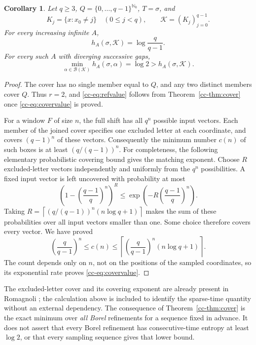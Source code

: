 \documentclass[11pt,reqno]{amsart}
\numberwithin{equation}{section}
\newtheorem{corollary}[theorem]{Corollary}
\theoremstyle{definition}
\theoremstyle{definition}
\newcommand{\Nzero}{\mathbb N_0}
\newcommand{\K}{\mathcal K}
\begin{document}
\begin{corollary}\label{cc-cor:covergap}
Let $q\ge3$, $Q=\{0,\ldots,q-1\}^{\Nzero}$, $T=\sigma$, and
\[
 K_j=\{x:x_0\ne j\}\quad(0\le j<q),\qquad \K=(K_j)_{j=0}^{q-1}.
\]
For every increasing infinite $A$,
\begin{equation}\label{cc-eq:covervalue}
 h_A(\sigma,\K)=\log\frac q{q-1}.
\end{equation}
For every such $A$ with diverging successive gaps,
\begin{equation}\label{cc-eq:refvalue}
 \min_{\alpha\in\mathcal B(\K)}h_A(\sigma,\alpha)=\log2
 >h_A(\sigma,\K).
\end{equation}
\end{corollary}
\begin{proof}
The cover has no single member equal to $Q$, and any two distinct
members cover $Q$. Thus $r=2$, and \eqref{cc-eq:refvalue} follows from
Theorem~\ref{cc-thm:cover} once \eqref{cc-eq:covervalue} is proved.

For a window $F$ of size $n$, the full shift has all $q^n$ possible
input vectors. Each member of the joined cover specifies one excluded
letter at each coordinate, and covers $(q-1)^n$ of these vectors.
Consequently the minimum number $c(n)$ of such boxes is at least
$(q/(q-1))^n$. For completeness, the following elementary probabilistic
covering bound gives the matching exponent. Choose $R$ excluded-letter
vectors independently and uniformly from the $q^n$ possibilities. A
fixed input vector is left uncovered with probability at most
\[
 \left(1-\left(\frac{q-1}{q}\right)^n\right)^R
 \le \exp\left(-R\left(\frac{q-1}{q}\right)^n\right).
\]
Taking
$R=\left\lceil(q/(q-1))^n(n\log q+1)\right\rceil$ makes the sum of
these probabilities over all input vectors smaller than one. Some
choice therefore covers every vector. We have proved
\[
 \left(\frac q{q-1}\right)^n\le c(n)
 \le\left\lceil\left(\frac q{q-1}\right)^n(n\log q+1)\right\rceil.
\]
The count depends only on $n$, not on the positions of the sampled
coordinates, so its exponential rate proves \eqref{cc-eq:covervalue}.
\end{proof}

The excluded-letter cover and its covering exponent are already present
in Romagnoli \cite{Romagnoli2007}; the calculation above is included to
identify the sparse-time quantity without an external dependency.
The consequence of Theorem~\ref{cc-thm:cover} is the exact minimum over
\emph{all Borel} refinements for a sequence fixed in advance. It does not
assert that every Borel refinement has consecutive-time entropy at least
$\log2$, or that every sampling sequence gives that lower bound.
\end{document}
